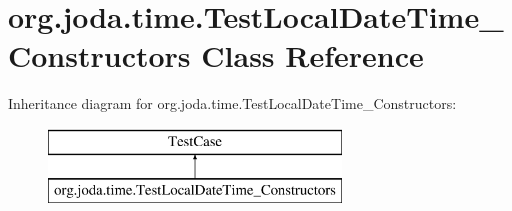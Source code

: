 \hypertarget{classorg_1_1joda_1_1time_1_1_test_local_date_time___constructors}{\section{org.\-joda.\-time.\-Test\-Local\-Date\-Time\-\_\-\-Constructors Class Reference}
\label{classorg_1_1joda_1_1time_1_1_test_local_date_time___constructors}
}
Inheritance diagram for org.\-joda.\-time.\-Test\-Local\-Date\-Time\-\_\-\-Constructors\-:\begin{figure}[H]
\begin{center}
\leavevmode
\includegraphics[height=2.000000cm]{classorg_1_1joda_1_1time_1_1_test_local_date_time___constructors}
\end{center}
\end{figure}
